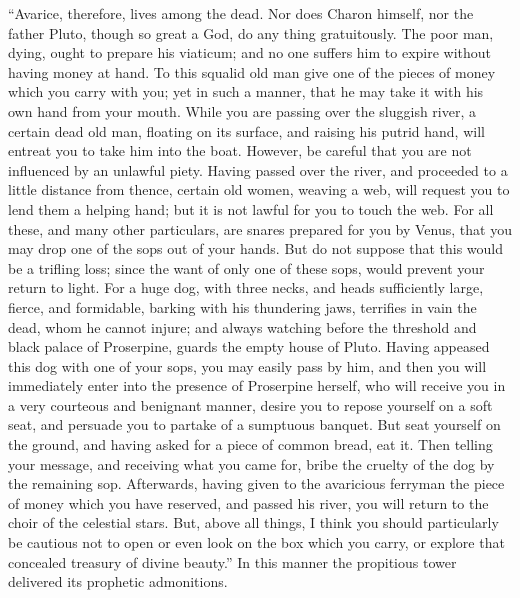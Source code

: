 \documentclass[12pt]{article}
\begin{document}
``Avarice, therefore, lives among the dead. Nor does Charon himself, nor the
father Pluto, though so great a God, do any thing gratuitously. The poor man,
dying, ought to prepare his viaticum; and no one suffers him to expire without
having money at hand. To this squalid old man give one of the pieces of money
which you carry with you; yet in such a manner, that he may take it with his
own hand from your mouth. While you are passing over the sluggish river, a
certain dead old man, floating on its surface, and raising his putrid hand,
will entreat you to take him into the boat. However, be careful that you are
not influenced by an unlawful piety. Having passed over the river, and
proceeded to a little distance from thence, certain old women, weaving a web,
will request you to lend them a helping hand; but it is not lawful for you to
touch the web. For all these, and many other particulars, are snares prepared
for you by Venus, that you may drop one of the sops out of your hands. But do
not suppose that this would be a trifling loss; since the want of only one of
these sops, would prevent your return to light. For a huge dog, with three
necks, and heads sufficiently large, fierce, and formidable, barking with his
thundering jaws, terrifies in vain the dead, whom he cannot injure; and always
watching before the threshold and black palace of Proserpine, guards the empty
house of Pluto. Having appeased this dog with one of your sops, you may easily
pass by him, and then you will immediately enter into the presence of
Proserpine herself, who will receive you in a very courteous and benignant
manner, desire you to repose yourself on a soft seat, and persuade you to
partake of a sumptuous banquet. But seat yourself on the ground, and having
asked for a piece of common bread, eat it. Then telling your message, and
receiving what you came for, bribe the cruelty of the dog by the remaining sop.
Afterwards, having given to the avaricious ferryman the piece of money which
you have reserved, and passed his river, you will return to the choir of the
celestial stars. But, above all things, I think you should particularly be
cautious not to open or even look on the box which you carry, or explore that
concealed treasury of divine beauty.'' In this manner the propitious tower
delivered its prophetic admonitions.
\end{document}
